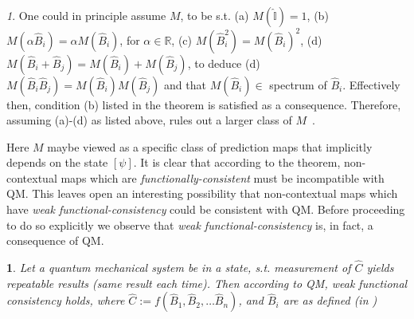 \documentclass[doublecol,british]{epl2}
\theoremstyle{plain}
\theoremstyle{plain}
\theoremstyle{definition}
\theoremstyle{remark}
\newtheorem*{rem}{\protect\remarkname}
\theoremstyle{remark}
\theoremstyle{remark}
\theoremstyle{plain}
\newtheorem*{prop*}{\protect\propositionname}
\theoremstyle{plain}
\theoremstyle{plain}
\theoremstyle{definition}
\theoremstyle{definition}
\providecommand{\propositionname}{Proposition}
\providecommand{\remarkname}{Remark}
\begin{document}
\begin{rem} One could in principle assume $M$, to
be s.t. (a) $M(\hat{\mathbb{I}})=1$, (b)
$M(\alpha\hat{B}_{i})=\alpha M(\hat{B}_{i})$, for
$\alpha\in\mathbb{R}$, (c)
$M(\hat{B}_{i}^{2})=M(\hat{B}_{i})^{2}$, (d)
$M(\hat{B}_{i}+\hat{B}_{j})=M(\hat{B}_{i})+M(\hat{B}_{j})$,
to deduce (d)
$M(\hat{B}_{i}\hat{B}_{j})=M(\hat{B}_{i})M(\hat{B}_{j})$
and that $M(\hat{B}_{i})\in$ spectrum of
$\hat{B}_{i}$. Effectively then, condition (b)
listed in the theorem is satisfied as a
consequence.  Therefore, assuming (a)-(d) as
listed above, rules out a larger class of
$M$~\cite{KochenSpecker}.
\end{rem} 
Here $M$ maybe viewed as a specific class of
prediction maps that implicitly depends on the
state $[\psi]$. It is clear that according to the
theorem, non-contextual maps which are
\emph{functionally-consistent} must be incompatible with
QM. 
This leaves open an interesting possibility that non-contextual maps which have \emph{weak functional-consistency} could be consistent with QM.
{  Before proceeding to do so explicitly we observe that \emph{weak functional-consistency} is, in fact, a consequence of QM.}
\begin{prop*} 
Let a quantum mechanical 
system be in a state, s.t. measurement of
$\hat{C}$ yields repeatable results (same result
each time). Then according to QM, \emph{weak functional consistency} holds, where $\hat{C}:=
f(\hat{B}_{1},\hat{B}_{2},\dots\hat{B}_{n})$, and
$\hat{B}_{i}$ are as defined (in )
\end{prop*}
\end{document}
